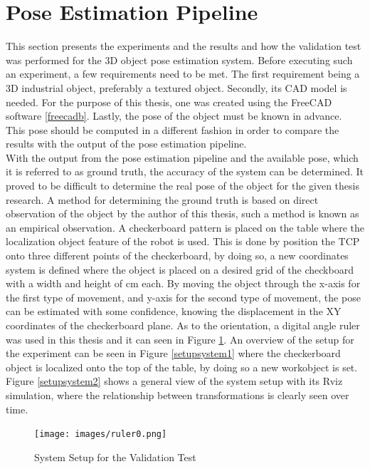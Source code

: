 \section{Pose Estimation Pipeline}

This section presents the experiments and the results and how the validation test was performed for the 3D object pose estimation system. Before executing such an experiment, a few requirements need to be met. The first requirement being a 3D industrial object, preferably a textured object. Secondly, its CAD model is needed. For the purpose of this thesis, one was created using the FreeCAD software \ref{freecadb}. Lastly, the pose of the object must be known in advance. This pose should be computed in a different fashion in order to compare the results with the output of the pose estimation pipeline.\\
With the output from the pose estimation pipeline and the available pose, which it is referred to as ground truth, the accuracy of the system can be determined. It proved to be difficult to determine the real pose of the object for the given thesis research. A method for determining the ground truth is based on direct observation of the object by the author of this thesis, such a method is known as an empirical observation. A checkerboard pattern is placed on the table where the localization object feature of the robot is used. This is done by position the TCP onto three different points of the checkerboard, by doing so, a new coordinates system is defined where the object is placed on a desired grid of the checkboard with a width and height of \unit[2]{cm} each. By moving the object through the x-axis for the first type of movement, and y-axis for the second type of movement, the pose can be estimated with some confidence, knowing the displacement in the XY coordinates of  the checkerboard plane. As to the orientation, a digital angle ruler was used in this thesis and it can seen in Figure \ref{fig:ruler}. An overview of the setup for the experiment can be seen in Figure \ref{setupsystem1} where the checkerboard object is localized onto the top of the table, by doing so a new workobject is set. Figure \ref{setupsystem2} shows a general view of the system setup with  its Rviz simulation, where the relationship between transformations is clearly seen over time. 

\begin{figure}[!h]
\begin{center}
\texttt{[image: images/ruler0.png]}
\caption{System Setup for the Validation Test }
\label{fig:ruler}
\end{center}
\end{figure}



